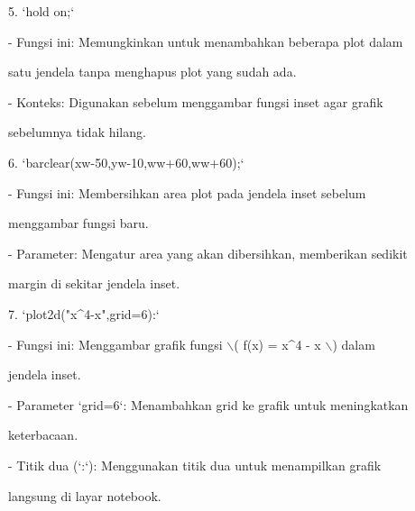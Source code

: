 \documentclass{article}
\begin{document}
\begin{eulernotebook}
\begin{eulercomment}
\begin{eulercomment}
\begin{eulercomment}
\begin{eulercomment}
\begin{eulercomment}
5. `hold on;`\\
\end{eulercomment}
\begin{eulerttcomment}
  - Fungsi ini: Memungkinkan untuk menambahkan beberapa plot dalam
\end{eulerttcomment}
\begin{eulercomment}
satu jendela tanpa menghapus plot yang sudah ada.\\
\end{eulercomment}
\begin{eulerttcomment}
  - Konteks: Digunakan sebelum menggambar fungsi inset agar grafik
\end{eulerttcomment}
\begin{eulercomment}
sebelumnya tidak hilang.

6. `barclear(xw-50,yw-10,ww+60,ww+60);`\\
\end{eulercomment}
\begin{eulerttcomment}
  - Fungsi ini: Membersihkan area plot pada jendela inset sebelum
\end{eulerttcomment}
\begin{eulercomment}
menggambar fungsi baru.\\
\end{eulercomment}
\begin{eulerttcomment}
  - Parameter: Mengatur area yang akan dibersihkan, memberikan sedikit
\end{eulerttcomment}
\begin{eulercomment}
margin di sekitar jendela inset.

7. `plot2d("x\textasciicircum{}4-x",grid=6):`\\
\end{eulercomment}
\begin{eulerttcomment}
  - Fungsi ini: Menggambar grafik fungsi \(\backslash\)( f(x) = x^4 - x \(\backslash\)) dalam
\end{eulerttcomment}
\begin{eulercomment}
jendela inset.\\
\end{eulercomment}
\begin{eulerttcomment}
  - Parameter `grid=6`: Menambahkan grid ke grafik untuk meningkatkan
\end{eulerttcomment}
\begin{eulercomment}
keterbacaan.\\
\end{eulercomment}
\begin{eulerttcomment}
  - Titik dua (`:`): Menggunakan titik dua untuk menampilkan grafik
\end{eulerttcomment}
\begin{eulercomment}
langsung di layar notebook.


\end{eulercomment}
\end{eulercomment}
\end{eulercomment}
\end{eulercomment}
\end{eulercomment}
\end{eulernotebook}
\end{document}
